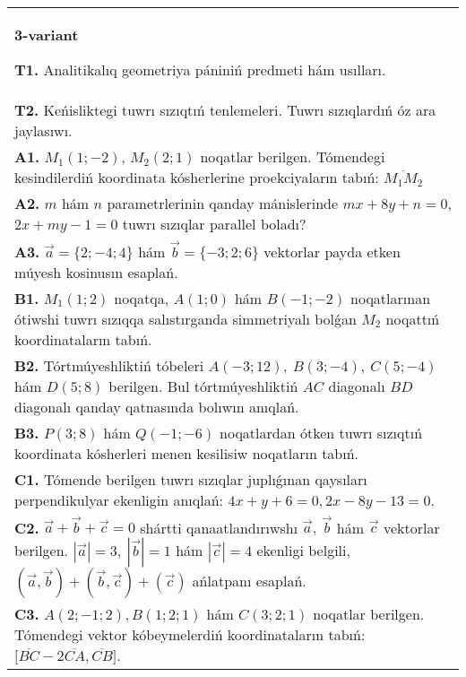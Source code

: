 \documentclass{article}
\begin{document}
\begin{tabular}{m{17cm}}
\textbf{3-variant}

\textbf{T1.} Analitikalıq geometriya pániniń predmeti hám usılları.
 \\
\textbf{T2.} 
Keńisliktegi tuwrı sızıqtıń tenlemeleri. Tuwrı sızıqlardıń óz ara jaylasıwı.
 \\
\textbf{A1.} 
$M_1 (1; -2) $, $M_2 (2; 1) $ noqatlar berilgen.
Tómendegi kesindilerdiń koordinata kósherlerine proekciyaların tabıń: $\overline{M_1M_2}$
 \\
\textbf{A2.} 
$m$ hám $n$ parametrlerinin qanday mánislerinde
$mx+8y+n=0$, $2x+my-1=0$ tuwrı sızıqlar parallel boladı?
 \\
\textbf{A3.} 
$\overrightarrow{a} = \{ 2; - 4;4\}$ hám $\overrightarrow{b} = \{ - 3;2;6\}$
vektorlar payda etken múyesh kosinusın esaplań.
 \\
\textbf{B1.} 
\(M_{1} (1;2) \) noqatqa, \(A (1;0) \) hám \(B (-1;-2) \)
noqatlarınan ótiwshi tuwrı sızıqqa salıstırganda simmetriyalı bolǵan \(M_{2}\) noqattıń koordinataların tabıń.
 \\
\textbf{B2.} 
Tórtmúyeshliktiń tóbeleri
\(A (-3;12),\ B (3;-4),\ C (5;-4) \) hám \(D (5;8) \) berilgen. Bul
tórtmúyeshliktiń $AC$ diagonalı $BD$ diagonalı qanday
qatnasında bolıwın anıqlań.
 \\
\textbf{B3.} 
\(P (3;8) \) hám \(Q (-1;-6) \) noqatlardan ótken
tuwrı sızıqtıń koordinata kósherleri menen kesilisiw noqatların tabıń.
 \\
\textbf{C1.} 
Tómende berilgen tuwrı sızıqlar juplıǵınan qaysıları
perpendikulyar ekenligin anıqlań: $4x+y+6=0, 2x-8y-13=0$.
 \\
\textbf{C2.} 
$\vec{a} + \vec{b} + \vec{c} = 0$ shártti qanaatlandırıwshı $\vec{a},\ \vec{b}$ hám $\vec{c}$ vektorlar berilgen. $|\vec{a}| = 3,\ |\vec{b}| = 1$ hám $|\vec{c}| = 4$ ekenligi belgili, $\left(\vec{a},\vec{b} \right) + \left(\vec{b},\vec{c} \right) + (\vec{c}) $ ańlatpanı esaplań.
 \\
\textbf{C3.} 
$A (2; -1;2), B (1;2; 1) $ hám $C (3;2;1) $ noqatlar berilgen. Tómendegi vektor kóbeymelerdiń koordinataların tabıń:
$\lbrack\overline{BC} - 2\overline{CA},\overline{CB}\rbrack$. \\

\end{tabular}
\vspace{1cm}
\end{document}

